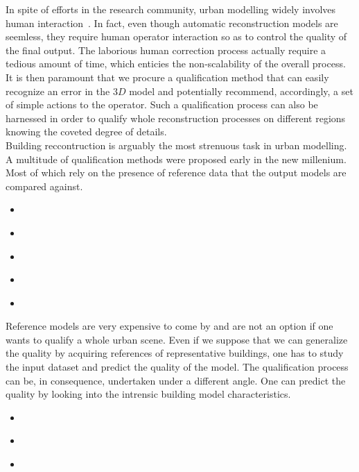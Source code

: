 \documentclass[../main.tex]{subfiles}
\begin{document}
    In spite of efforts in the research community, urban modelling widely involves human interaction~\cite{Musialski2012}. In fact, even though automatic reconstruction models are seemless, they require human operator interaction so as to control the quality of the final output. The laborious human correction process actually require a tedious amount of time, which enticies the non-scalability of the overall process. It is then paramount that we procure a qualification method that can easily recognize an error in the $3D$ model and potentially recommend, accordingly, a set of simple actions to the operator. Such a qualification process can also be harnessed in order to qualify whole reconstruction processes on different regions knowing the coveted degree of details.\\

    Building reccontruction is arguably the most strenuous task in urban modelling. A multitude of qualification methods were proposed early in the new millenium. Most of which rely on the presence of reference data that the output models are compared against.
    \begin{itemize}
        \item ~\cite{Akca2010}
        \item ~\cite{Zeng2014}
        \item ~\cite{Kaartinen2005}
        \item ~\cite{Voegtle2003}
        \item ~\cite{Schuster2003}
    \end{itemize}
    Reference models are very expensive to come by and are not an option if one wants to qualify a whole urban scene. Even if we suppose that we can generalize the quality by acquiring references of representative buildings, one has to study the input dataset and predict the quality of the model. The qualification process can be, in consequence, undertaken under a different angle. One can predict the quality by looking into the intrensic building model characteristics.
    \begin{itemize}
        \item ~\cite{OudeElberink2010}
        \item ~\cite{Boudet2006}
        \item ~\cite{michelin2013quality}
    \end{itemize}
\end{document}
